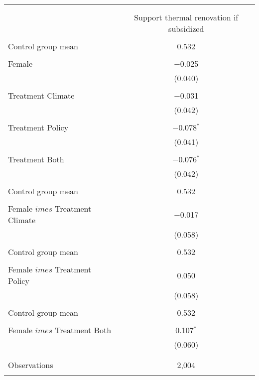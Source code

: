 
\begin{tabular}{@{\extracolsep{5pt}}lc} 
\\[-1.8ex]\hline 
\hline \\[-1.8ex] 
\\[-1.8ex] & Support thermal renovation if subsidized \\ 
\hline \\[-1.8ex] 
 Control group mean & 0.532  \\ \hline \\[-1.8ex] Female & $-$0.025 \\ 
  & (0.040) \\ 
  & \\ 
 Treatment Climate & $-$0.031 \\ 
  & (0.042) \\ 
  & \\ 
 Treatment Policy & $-$0.078$^{*}$ \\ 
  & (0.041) \\ 
  & \\ 
 Treatment Both & $-$0.076$^{*}$ \\ 
  & (0.042) \\ 
  & \\ 
 Control group mean & 0.532  \\ \hline \\[-1.8ex] Female $	imes$ Treatment Climate & $-$0.017 \\ 
  & (0.058) \\ 
  & \\ 
 Control group mean & 0.532  \\ \hline \\[-1.8ex] Female $	imes$ Treatment Policy & 0.050 \\ 
  & (0.058) \\ 
  & \\ 
 Control group mean & 0.532  \\ \hline \\[-1.8ex] Female $	imes$ Treatment Both & 0.107$^{*}$ \\ 
  & (0.060) \\ 
  & \\ 
\hline \\[-1.8ex] 

Observations & 2,004 \\ 
\hline 
\hline \\[-1.8ex] 
\end{tabular} 